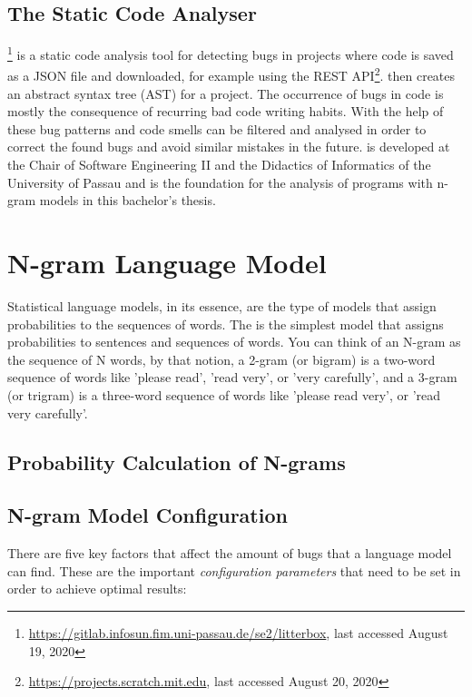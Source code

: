 \subsection{The Static \scratch{} Code Analyser \litterbox{}}\label{subsec:litterbox}
\litterbox{}\footnote{\url{https://gitlab.infosun.fim.uni-passau.de/se2/litterbox}, last accessed August 19, 2020} is a static code analysis tool for detecting bugs in \scratch{} projects where \scratch{} code is saved as a JSON file and downloaded, for example using the \scratch{} REST API\footnote{\url{https://projects.scratch.mit.edu}, last accessed August 20, 2020}. \litterbox{} then creates an abstract syntax tree (AST) for a \scratch{} project. The occurrence of bugs in code is mostly the consequence of recurring bad code writing habits. With the help of \litterbox{} these bug patterns and code smells can be filtered and analysed in order to correct the found bugs and avoid similar mistakes in the future. \litterbox{} is developed at the Chair of Software Engineering II and the Didactics of Informatics of the University of Passau and is the foundation for the analysis of \scratch{} programs with n-gram models in this bachelor's thesis. 


\section{N-gram Language Model}\label{sec:language-models}
Statistical language models, in its essence, are the type of models that assign probabilities to the sequences of words. The \ngram{} is the simplest model that assigns probabilities to sentences and sequences of words. You can think of an N-gram as the sequence of N words, by that notion, a 2-gram (or bigram) is a two-word sequence of words like 'please read', 'read very', or 'very carefully', and a 3-gram (or trigram) is a three-word sequence of words like 'please read very', or 'read very carefully'.

\subsection{Probability Calculation of N-grams}\label{subsec:ngram}

\subsection{N-gram Model Configuration}\label{subsec:ngram}
There are five key factors that affect the amount of bugs that a language model can find. These are the important \textit{configuration parameters} that need to be set in order to achieve optimal results:  

